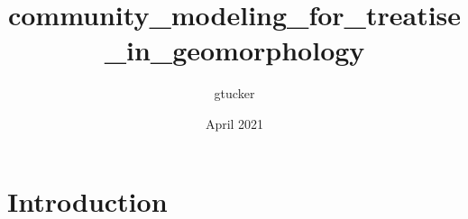 \documentclass{article}
\title{community_modeling_for_treatise_in_geomorphology}
\author{gtucker }
\date{April 2021}
\begin{document}
\maketitle

\section{Introduction}
\end{document}
